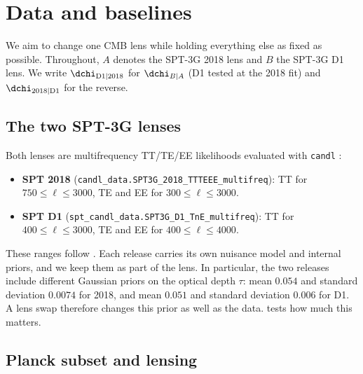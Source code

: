 \section{Data and baselines}
\label{sec:baselines}

We aim to change one CMB lens while holding everything else as fixed as possible. Throughout, $A$ denotes the SPT-3G 2018 lens and $B$ the SPT-3G D1 lens. We write $\dchi_{\mathrm{D1}|2018}$ for $\dchi_{B|A}$ (D1 tested at the 2018 fit) and $\dchi_{2018|\mathrm{D1}}$ for the reverse.

\subsection{The two SPT-3G lenses}
\label{sec:spt-lenses}

Both lenses are multifrequency TT/TE/EE likelihoods evaluated with \texttt{candl} \cite{candl}:
\begin{itemize}[leftmargin=*, itemsep=2pt]
  \item \textbf{SPT 2018} \cite{spt3g2018_ttteee} (\texttt{candl\_data.SPT3G\_2018\_TTTEEE\_multifreq}): TT for $750\le\ell\le3000$, TE and EE for $300\le\ell\le3000$.
  \item \textbf{SPT D1} \cite{spt3g_d1} (\texttt{spt\_candl\_data.SPT3G\_D1\_TnE\_multifreq}): TT for $400\le\ell\le3000$, TE and EE for $400\le\ell\le4000$.
\end{itemize}
These ranges follow \cite{arxiv2601_16277}. Each release carries its own nuisance model and internal priors, and we keep them as part of the lens. In particular, the two releases include different Gaussian priors on the optical depth $\tau$: mean $0.054$ and standard deviation $0.0074$ for 2018, and mean $0.051$ and standard deviation $0.006$ for D1. A lens swap therefore changes this prior as well as the data.  tests how much this matters.

\subsection{Planck subset and lensing}
\label{sec:planck-subset}

